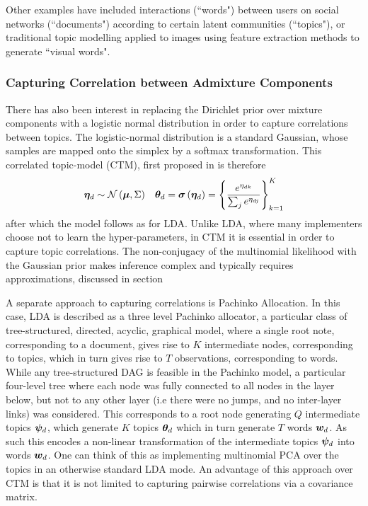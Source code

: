 Other examples have included interactions (``words") between users on social networks (``documents") according to certain latent communities (``topics")\cite{Zhang2007}, or traditional topic modelling applied to images\cite{Philbin2008} using feature extraction methods to generate ``visual words". 

\subsubsection{Capturing Correlation between Admixture Components}

There has also been interest in replacing the Dirichlet prior over mixture components with a logistic normal distribution in order to capture correlations between topics. The logistic-normal distribution is a standard Gaussian, whose samples are mapped onto the simplex by a softmax transformation. This correlated topic-model (CTM), first proposed in \cite{Blei2006} is therefore
\begin{align}
\bm \eta_d & \sim \mathcal{N} \left( {\bm \mu}, {\Sigma} \right) & { \bm \theta_d } = \bm \sigma\left(\bm \eta_d\right) = \left\{\frac{e^{\eta_{dk}}}{\sum_j e^{\eta_{dj}}}\right\}_{k=1}^K
\end{align}
after which the model follows as for LDA. Unlike LDA, where many implementers choose not to learn the hyper-parameters, in CTM it is essential in order to capture topic correlations. The non-conjugacy of the multinomial likelihood with the Gaussian prior makes inference complex and typically requires approximations, discussed in section 

A separate approach to capturing correlations is Pachinko Allocation\cite{Li2006}. In this case, LDA is described as a three level Pachinko allocator, a particular class of tree-structured, directed, acyclic, graphical model, where a single root note, corresponding to a document, gives rise to $K$ intermediate nodes, corresponding to topics, which in turn gives rise to $T$ observations, corresponding to words. While any tree-structured DAG is feasible in the Pachinko model, a particular four-level tree where each node was fully connected to all nodes in the layer below, but not to any other layer (i.e there were no jumps, and no inter-layer links) was considered. This corresponds to a root node generating $Q$ intermediate topics $\bm \psi_d$, which generate $K$ topics ${ \bm \theta_d }$ which in turn generate $T$ words ${ \bm w_d }$. As such this encodes a non-linear transformation of the intermediate topics $\bm \psi_d$ into words ${ \bm w_d }$. One can think of this as implementing multinomial PCA over the topics in an otherwise standard LDA mode. An advantage of this approach over CTM is that it is not limited to capturing pairwise correlations via a covariance matrix.

